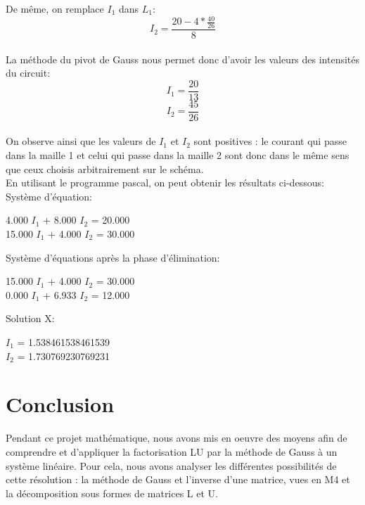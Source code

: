 \documentclass[a4paper,12pt]{report}
\begin{document}
De même, on remplace $I_{1}$ dans $L_{1}$:
$$I_{2}=\frac{20-4*\frac{40}{26}}{8}$$\\

La méthode du pivot de Gauss nous permet donc d'avoir les valeurs des intensités du circuit:
$$I_{1}=\frac{20}{13}$$
$$I_{2}=\frac{45}{26}$$\\



On observe ainsi que les valeurs de $I_{1}$ et $I_{2}$ sont positives : le courant qui passe dans la maille 1 et celui qui passe dans la maille 2 sont donc dans le même sens que ceux choisis arbitrairement sur le schéma.\\

En utilisant le programme pascal, on peut obtenir les résultats ci-dessous:\\

Système d'équation:\\
\begin{center}
	4.000 $I_{1}$ + 8.000 $I_{2}$ = 20.000\\
	15.000 $I_{1}$ + 4.000 $I_{2}$ = 30.000\\
\end{center}

Système d'équations après la phase d'élimination:\\
\begin{center}
	15.000 $I_{1}$ + 4.000 $I_{2}$ = 30.000\\
	0.000 $I_{1}$ + 6.933 $I_{2}$ = 12.000\\
\end{center}

Solution X:\\
\begin{center}
	$I_{1}$ = 1.538461538461539\\
	$I_{2}$ = 1.730769230769231\\
\end{center}

\newpage
\chapter*{Conclusion}
Pendant ce projet mathématique, nous avons mis en oeuvre des moyens afin de comprendre et d'appliquer la factorisation LU par la méthode de Gauss à un système linéaire. Pour cela, nous avons analyser les différentes possibilités de cette résolution : la méthode de Gauss et l'inverse d'une matrice, vues en M4 et la décomposition sous formes de matrices L et U.\\
\end{document}
